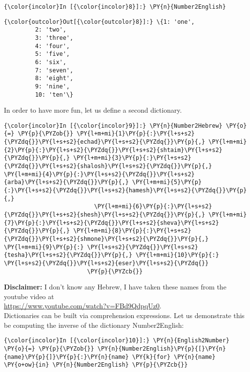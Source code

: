 \begin{Verbatim}[commandchars=\\\{\}]
{\color{incolor}In [{\color{incolor}8}]:} \PY{n}{Number2English}
\end{Verbatim}

\begin{Verbatim}[commandchars=\\\{\}]
{\color{outcolor}Out[{\color{outcolor}8}]:} \{1: 'one',
         2: 'two',
         3: 'three',
         4: 'four',
         5: 'five',
         6: 'six',
         7: 'seven',
         8: 'eight',
         9: 'nine',
         10: 'ten'\}
\end{Verbatim}          
In order to have more fun, let us define a second dictionary.
\begin{Verbatim}[commandchars=\\\{\}]
{\color{incolor}In [{\color{incolor}9}]:} \PY{n}{Number2Hebrew} \PY{o}{=} \PY{p}{\PYZob{}} \PY{l+m+mi}{1}\PY{p}{:}\PY{l+s+s2}{\PYZdq{}}\PY{l+s+s2}{echad}\PY{l+s+s2}{\PYZdq{}}\PY{p}{,} \PY{l+m+mi}{2}\PY{p}{:}\PY{l+s+s2}{\PYZdq{}}\PY{l+s+s2}{shtaim}\PY{l+s+s2}{\PYZdq{}}\PY{p}{,} \PY{l+m+mi}{3}\PY{p}{:}\PY{l+s+s2}{\PYZdq{}}\PY{l+s+s2}{shalosh}\PY{l+s+s2}{\PYZdq{}}\PY{p}{,} \PY{l+m+mi}{4}\PY{p}{:}\PY{l+s+s2}{\PYZdq{}}\PY{l+s+s2}{arba}\PY{l+s+s2}{\PYZdq{}}\PY{p}{,} \PY{l+m+mi}{5}\PY{p}{:}\PY{l+s+s2}{\PYZdq{}}\PY{l+s+s2}{hamesh}\PY{l+s+s2}{\PYZdq{}}\PY{p}{,} 
                          \PY{l+m+mi}{6}\PY{p}{:}\PY{l+s+s2}{\PYZdq{}}\PY{l+s+s2}{shesh}\PY{l+s+s2}{\PYZdq{}}\PY{p}{,} \PY{l+m+mi}{7}\PY{p}{:}\PY{l+s+s2}{\PYZdq{}}\PY{l+s+s2}{sheva}\PY{l+s+s2}{\PYZdq{}}\PY{p}{,} \PY{l+m+mi}{8}\PY{p}{:}\PY{l+s+s2}{\PYZdq{}}\PY{l+s+s2}{shmone}\PY{l+s+s2}{\PYZdq{}}\PY{p}{,} \PY{l+m+mi}{9}\PY{p}{:} \PY{l+s+s2}{\PYZdq{}}\PY{l+s+s2}{tesha}\PY{l+s+s2}{\PYZdq{}}\PY{p}{,} \PY{l+m+mi}{10}\PY{p}{:} \PY{l+s+s2}{\PYZdq{}}\PY{l+s+s2}{eser}\PY{l+s+s2}{\PYZdq{}}
                        \PY{p}{\PYZcb{}}
\end{Verbatim}
\textbf{Disclaimer:} I don't know any Hebrew, I have taken these names from the youtube video at
\\[0.2cm]
\hspace*{1.3cm}
\href{https://www.youtube.com/watch?v=FBd9QdpqUz0}{https://www.youtube.com/watch?v=FBd9QdpqUz0}.
\\[0.2cm]
Dictionaries can be built via comprehension expressions. Let us
demonstrate this be computing the inverse of the dictionary
Number2English:
\begin{Verbatim}[commandchars=\\\{\}]
{\color{incolor}In [{\color{incolor}10}]:} \PY{n}{English2Number} \PY{o}{=} \PY{p}{\PYZob{}} \PY{n}{Number2English}\PY{p}{[}\PY{n}{name}\PY{p}{]}\PY{p}{:}\PY{n}{name} \PY{k}{for} \PY{n}{name} \PY{o+ow}{in} \PY{n}{Number2English} \PY{p}{\PYZcb{}}
\end{Verbatim}

